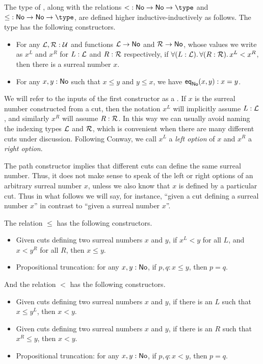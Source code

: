 \begin{defn}\label{defn:surreals}
  The type \NO of ,
  along with the relations $\mathord<:\NO\to\NO\to\type$ and $\mathord\le:\NO\to\NO\to\type$, are defined higher inductive-inductively as follows.
  The type \NO has the following constructors.
  \begin{itemize}
  \item For any $\mathcal{L},\mathcal{R}:\mathcal{U}$ and functions $\mathcal{L}\to \mathsf{No}$ and $\mathcal{R}\to \mathsf{No}$, whose values we write as $x^L$ and $x^R$ for $L:\mathcal{L}$ and $R:\mathcal{R}$ respectively, if $\fall{L:\LL}{R:\RR} x^L<x^R$, then there is a surreal number $x$.
  \item For any $x,y:\mathsf{No}$ such that $x\le y$ and $y\le x$, we have $\mathsf{eq}_{\mathsf{No}}(x,y):x=y$.
  \end{itemize}
  We will refer to the inputs of the first constructor as a .
  If $x$ is the surreal number constructed from a cut, then the notation $x^L$ will implicitly assume $L:\mathcal{L}$, and similarly $x^R$ will assume $R:\mathcal{R}$.
  In this way we can usually avoid naming the indexing types $\mathcal{L}$ and $\mathcal{R}$, which is convenient when there are many different cuts under discussion.
  Following Conway, we call $x^L$ a \emph{left option} of $x$ and $x^R$ a \emph{right option}.

  The path constructor implies that different cuts can define the same surreal number.
  Thus, it does not make sense to speak of the left or right options of an arbitrary surreal number $x$, unless we also know that $x$ is defined by a particular cut.
  Thus in what follows we will say, for instance, ``given a cut defining a surreal number $x$'' in contrast to ``given a surreal number $x$''.

  The relation $\le$ has the following constructors.
  \begin{itemize}
  \item Given cuts defining two surreal numbers $x$ and $y$, if $x^L<y$ for all $L$, and $x<y^R$ for all $R$, then $x\le y$.
  \item Propositional truncation:
    for any $x,y:\mathsf{No}$, if $p,q:x\le y$, then $p=q$.
  \end{itemize}
  And the relation $<$ has the following constructors.
  \begin{itemize}
  \item Given cuts defining two surreal numbers $x$ and $y$, if there is an $L$ such that $x\le y^L$, then $x<y$.
  \item Given cuts defining two surreal numbers $x$ and $y$, if there is an $R$ such that $x^R\le y$, then $x<y$.
  \item Propositional truncation: for any $x,y:\mathsf{No}$, if $p,q:x<y$, then $p=q$.
  \end{itemize}
\end{defn}

